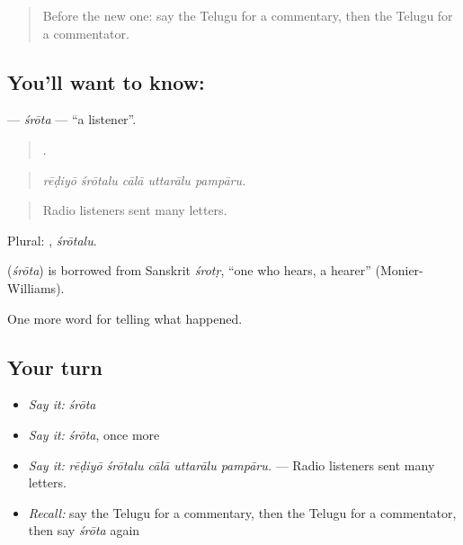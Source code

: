 \label{lesson:TE-C374-srota}



\begin{quote}
Before the new one: say the Telugu for a commentary, then the Telugu for a commentator.
\end{quote}

\subsection*{You'll want to know: }
\textbf{} — \emph{śrōta} — \textquotedblleft{}a listener\textquotedblright{}.

\begin{quote}
    .
\end{quote}

\begin{quote}
\emph{rēḍiyō śrōtalu cālā uttarālu pampāru.}
\end{quote}

\begin{quote}
Radio listeners sent many letters.
\end{quote}

Plural: , \emph{śrōtalu}.

\begin{cousinweb}
\textbf{} (\emph{śrōta}) is borrowed from Sanskrit \emph{śrotṛ}, \textquotedblleft{}one who hears, a hearer\textquotedblright{} (Monier-Williams).
\end{cousinweb}

\begin{grammarlens}[title={What you've built}]
One more word for telling what happened.
\end{grammarlens}

\subsection*{Your turn}
\begin{itemize}
\raggedright
  \item \emph{Say it:} \emph{śrōta}
  \item \emph{Say it:} \emph{śrōta}, once more
  \item \emph{Say it:} \emph{rēḍiyō śrōtalu cālā uttarālu pampāru.} — Radio listeners sent many letters.
  \item \emph{Recall:} say the Telugu for a commentary, then the Telugu for a commentator, then say \emph{śrōta} again
\end{itemize}

